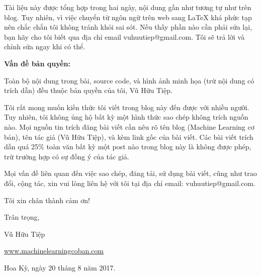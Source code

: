 
Tài liệu này được tổng hợp trong hai ngày, nội dung gần như tương tự như trên blog. Tuy nhiên, vì việc chuyển từ ngôn ngữ trên web sang LaTeX khá phức tạp nên chắc chắn tôi không tránh khỏi sai sót. Nếu thấy phần nào cần phải sửa lại, bạn hãy cho tôi biết qua địa chỉ email vuhuutiep@gmail.com. Tôi sẽ trả lời và chỉnh sửa ngay khi có thể. 


\textbf{Vấn đề bản quyền:}

Toàn bộ nội dung trong bài, source code, và hình ảnh minh họa (trừ nội dung có trích dẫn) đều thuộc bản quyền của tôi, Vũ Hữu Tiệp. 

Tôi rất mong muốn kiến thức tôi viết trong blog này đến được với nhiều người. Tuy nhiên, tôi không ủng hộ bất kỳ một hình thức sao chép không trích nguồn nào. Mọi nguồn tin trích đăng bài viết cần nêu rõ tên blog (Machine Learning cơ bản), tên tác giả (Vũ Hữu Tiệp), và kèm link gốc của bài viết. Các bài viết trích dẫn quá 25\% toàn văn bất kỳ một post nào trong blog này là không được phép, trừ trường hợp có sự đồng ý của tác giả.

Mọi vấn đề liên quan đến việc sao chép, đăng tải, sử dụng bài viết, cũng như trao đổi, cộng tác, xin vui lòng liên hệ với tôi tại địa chỉ email: vuhuutiep@gmail.com.

Tôi xin chân thành cảm ơn!

Trân trọng,

Vũ Hữu Tiệp

\href{www.machinelearningcoban.com}{www.machinelearningcoban.com}

Hoa Kỳ, ngày 20 tháng 8 năm 2017.


